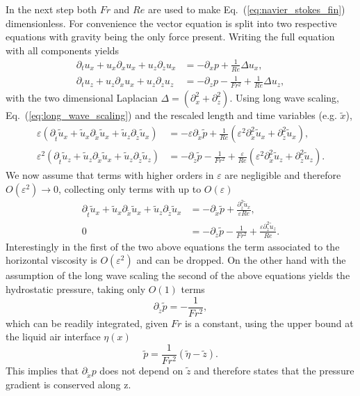 In the next step both $Fr$ and $Re$ are used to make Eq.~(\ref{eq:navier_stokes_fin}) dimensionless.
For convenience the vector equation is split into two respective equations with gravity being the only force present.
Writing the full equation with all components yields
\begin{align}\label{eq:2d_RNS}
    \partial_t u_x + u_x\partial_x u_x + u_z\partial_z u_x &= -\partial_x p + \frac{1}{Re}\Delta u_x ,\\
    \partial_t u_z + u_z\partial_x u_x + u_z\partial_z u_z &= -\partial_z p - \frac{1}{Fr^2} + \frac{1}{Re}\Delta u_z ,
\end{align}
with the two dimensional Laplacian $\Delta = (\partial_x^2 + \partial_z^2)$.
Using long wave scaling, Eq.~(\ref{eq:long_wave_scaling}) and the rescaled length and time variables (e.g. $\tilde{x}$),
\begin{align}\label{eq:2d_RNS_eps}
    \varepsilon(\partial_{\tilde{t}} \tilde{u}_x + \tilde{u}_x \partial_{\tilde{x}} \tilde{u}_x + \tilde{u}_z \partial_{\tilde{z}} \tilde{u}_x ) &= -\varepsilon\partial_{\tilde{x}} \tilde{p} + \frac{1}{Re}(\varepsilon^2 \partial_{\tilde{x}}^2 \tilde{u}_x + \partial_{\tilde{z}}^2 \tilde{u}_x ) ,\\
    \varepsilon^2(\partial_{\tilde{t}} \tilde{u}_z + \tilde{u}_z\partial_{\tilde{x}} \tilde{u}_x + \tilde{u}_z\partial_{\tilde{z}} \tilde{u}_z) &= -\partial_{\tilde{z}}\tilde{p} - \frac{1}{Fr^2} + \frac{\varepsilon}{Re}(\varepsilon^2 \partial_{\tilde{x}}^2 \tilde{u}_z + \partial_{\tilde{z}}^2 \tilde{u}_z ) .
\end{align}
We now assume that terms with higher orders in $\varepsilon$ are negligible and therefore $O(\varepsilon^2) \rightarrow 0$, collecting only terms with up to $O(\varepsilon)$
\begin{align}\label{eq:2d_RNS_linear}
    \partial_{\tilde{t}} \tilde{u}_x + \tilde{u}_x\partial_{\tilde{x}} \tilde{u}_x + \tilde{u}_z\partial_{\tilde{z}} \tilde{u}_x &= -\partial_{\tilde{x}} \tilde{p} + \frac{\partial_{\tilde{z}}^2\tilde{u}_x}{\varepsilon Re}, \\
    0 &= -\partial_{\tilde{z}}\tilde{p} - \frac{1}{Fr^2} + \frac{\varepsilon\partial_{\tilde{z}}^2 \tilde{u}_z}{Re} .
\end{align}
Interestingly in the first of the two above equations the term associated to the horizontal viscosity is $O(\varepsilon^2)$ and can be dropped.
On the other hand with the assumption of the long wave scaling the second of the above equations yields the hydrostatic pressure, taking only $O(1)$ terms
\begin{equation}\label{eq:hydro_static}
    \partial_{\tilde{z}}\tilde{p} = -\frac{1}{Fr^2},
\end{equation}
which can be readily integrated, given $Fr$ is a constant, using the upper bound at the liquid air interface $\eta(x)$ 
\begin{equation}\label{eq:hydro_static_int}
    \tilde{p} = \frac{1}{Fr^2}(\tilde{\eta} - \tilde{z}).   
\end{equation}
This implies that $\partial_{\tilde{x}}p$ does not depend on $\tilde{z}$ and therefore states that the pressure gradient is conserved along z.

